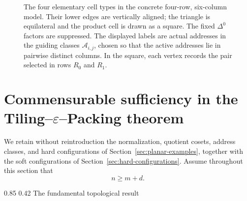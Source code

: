 \documentclass[11pt,reqno]{amsart}
\makeatletter
\numberwithin{equation}{section}
\renewcommand\subsection{\@startsection{subsection}{2}{\z@}%
  {0.85\baselineskip \@plus 0.25\baselineskip \@minus 0.10\baselineskip}%
  {0.42\baselineskip}%
  {\normalfont\bfseries}}
\theoremstyle{definition}
\theoremstyle{remark}
\makeatother
\begin{document}
\begin{figure}[htbp]
\caption{The four elementary cell types in the concrete four-row,
six-column model.  Their lower edges are vertically aligned; the triangle is
equilateral and the product cell is drawn as a square.  The fixed
$\Delta^0$ factors are suppressed.  The displayed labels are actual
addresses in the guiding classes $\mathcal A_{i,j}$, chosen so that
the active addresses lie in pairwise distinct columns.  In the square, each
vertex records the pair selected in rows $R_0$ and $R_1$.}
\label{fig:soft-cell-types}
\end{figure}

\section{Commensurable sufficiency in the Tiling--$\varepsilon$--Packing theorem}
\label{sec:soft-configurations}

We retain without reintroduction the normalization, quotient cosets,
address classes, and hard configurations of
Section~\ref{sec:planar-examples}, together with the soft configurations of
Section~\ref{sec:hard-configurations}.
Assume throughout this section that
\begin{equation}\label{eq:commensurable-gap}
 n\ge m+d.
\end{equation}

\subsection{The fundamental topological result}
\end{document}
